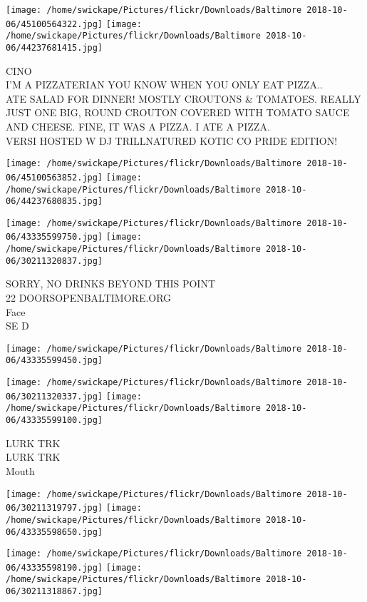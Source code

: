 \documentclass[10pt,letterpaper]{article}
\begin{document}
\texttt{[image: /home/swickape/Pictures/flickr/Downloads/Baltimore 2018-10-06/45100564322.jpg]}
\texttt{[image: /home/swickape/Pictures/flickr/Downloads/Baltimore 2018-10-06/44237681415.jpg]}

CINO\\
I'M A PIZZATERIAN YOU KNOW WHEN YOU ONLY EAT PIZZA..\\
ATE SALAD FOR DINNER!  MOSTLY CROUTONS \& TOMATOES.  REALLY JUST ONE BIG, ROUND CROUTON COVERED WITH TOMATO SAUCE AND CHEESE.  FINE, IT WAS A PIZZA.  I ATE A PIZZA.\\
VERSI HOSTED W DJ TRILLNATURED KOTIC CO PRIDE EDITION!
\pagebreak

\texttt{[image: /home/swickape/Pictures/flickr/Downloads/Baltimore 2018-10-06/45100563852.jpg]}
\texttt{[image: /home/swickape/Pictures/flickr/Downloads/Baltimore 2018-10-06/44237680835.jpg]}

\texttt{[image: /home/swickape/Pictures/flickr/Downloads/Baltimore 2018-10-06/43335599750.jpg]}
\texttt{[image: /home/swickape/Pictures/flickr/Downloads/Baltimore 2018-10-06/30211320837.jpg]}

SORRY, NO DRINKS BEYOND THIS POINT\\
22 DOORSOPENBALTIMORE.ORG\\
Face\\
SE D
\pagebreak

\texttt{[image: /home/swickape/Pictures/flickr/Downloads/Baltimore 2018-10-06/43335599450.jpg]}

\vspace{0.25in}
\texttt{[image: /home/swickape/Pictures/flickr/Downloads/Baltimore 2018-10-06/30211320337.jpg]}
\texttt{[image: /home/swickape/Pictures/flickr/Downloads/Baltimore 2018-10-06/43335599100.jpg]}

LURK TRK\\
LURK TRK\\
Mouth
\pagebreak

\texttt{[image: /home/swickape/Pictures/flickr/Downloads/Baltimore 2018-10-06/30211319797.jpg]}
\texttt{[image: /home/swickape/Pictures/flickr/Downloads/Baltimore 2018-10-06/43335598650.jpg]}

\texttt{[image: /home/swickape/Pictures/flickr/Downloads/Baltimore 2018-10-06/43335598190.jpg]}
\texttt{[image: /home/swickape/Pictures/flickr/Downloads/Baltimore 2018-10-06/30211318867.jpg]}
\end{document}
